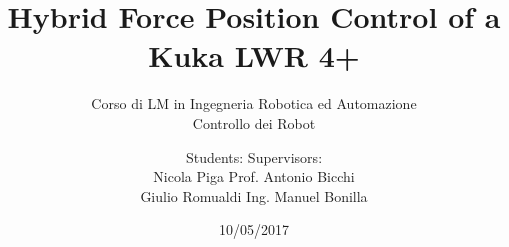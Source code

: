 \documentclass{beamer}
\date{10/05/2017}
\title[Hybrid Force Position Control]{Hybrid Force Position Control of a Kuka LWR 4+}
\subtitle{Corso di LM in Ingegneria Robotica ed Automazione \\
  Controllo dei Robot}
\author{Students:\hskip3in Supervisors:\\
Nicola Piga \hskip2.3in Prof. Antonio Bicchi\\
Giulio Romualdi \hskip2.1in Ing. Manuel Bonilla}
\institute[]{Università di Pisa}
\begin{document}

\begin{frame}
  \maketitle
\end{frame}













\end{document}
